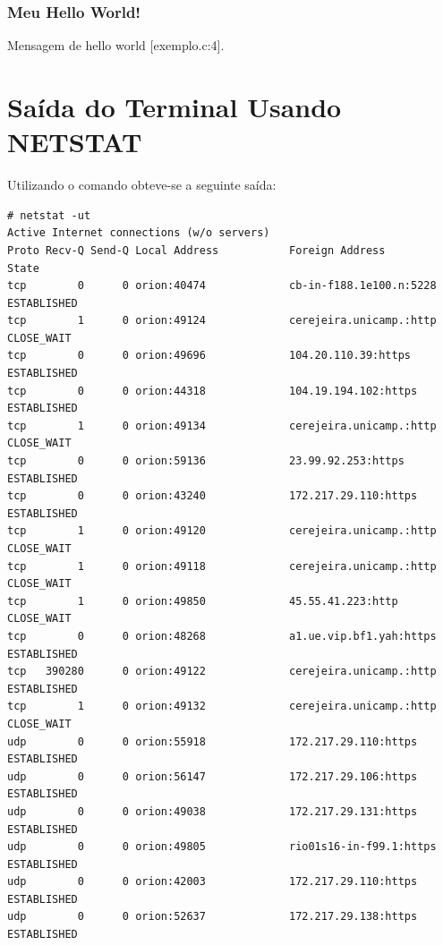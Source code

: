 \documentclass[12pt,a4paper]{report}
\begin{document}
\subsubsection{Meu Hello World!}
Mensagem de hello world [exemplo.c:4].



\section{Saída do Terminal Usando NETSTAT}

Utilizando o comando  obteve-se a seguinte saída:

\begin{lstlisting}[style=BStyle]
# netstat -ut
Active Internet connections (w/o servers)
Proto Recv-Q Send-Q Local Address           Foreign Address         State      
tcp        0      0 orion:40474             cb-in-f188.1e100.n:5228 ESTABLISHED
tcp        1      0 orion:49124             cerejeira.unicamp.:http CLOSE_WAIT 
tcp        0      0 orion:49696             104.20.110.39:https     ESTABLISHED
tcp        0      0 orion:44318             104.19.194.102:https    ESTABLISHED
tcp        1      0 orion:49134             cerejeira.unicamp.:http CLOSE_WAIT 
tcp        0      0 orion:59136             23.99.92.253:https      ESTABLISHED
tcp        0      0 orion:43240             172.217.29.110:https    ESTABLISHED
tcp        1      0 orion:49120             cerejeira.unicamp.:http CLOSE_WAIT 
tcp        1      0 orion:49118             cerejeira.unicamp.:http CLOSE_WAIT 
tcp        1      0 orion:49850             45.55.41.223:http       CLOSE_WAIT 
tcp        0      0 orion:48268             a1.ue.vip.bf1.yah:https ESTABLISHED
tcp   390280      0 orion:49122             cerejeira.unicamp.:http ESTABLISHED
tcp        1      0 orion:49132             cerejeira.unicamp.:http CLOSE_WAIT 
udp        0      0 orion:55918             172.217.29.110:https    ESTABLISHED
udp        0      0 orion:56147             172.217.29.106:https    ESTABLISHED
udp        0      0 orion:49038             172.217.29.131:https    ESTABLISHED
udp        0      0 orion:49805             rio01s16-in-f99.1:https ESTABLISHED
udp        0      0 orion:42003             172.217.29.110:https    ESTABLISHED
udp        0      0 orion:52637             172.217.29.138:https    ESTABLISHED
\end{lstlisting}

\end{document}
